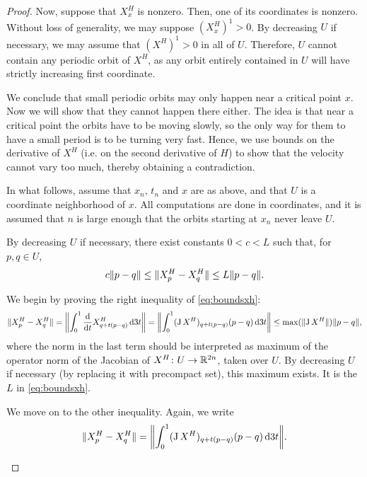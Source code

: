 \begin{proof}
Now, suppose that $X^H_x$ is nonzero. Then, one of its coordinates is nonzero. Without loss of generality, we may suppose $(X^H_x)^1 > 0$. By decreasing $U$ if necessary, we may assume that $(X^H)^1 > 0$ in all of $U$. Therefore, $U$ cannot contain any periodic orbit of $X^H$, as any orbit entirely contained in $U$ will have strictly increasing first coordinate.

We conclude that small periodic orbits may only happen near a critical point $x$. Now we will show that they cannot happen there either. The idea is that near a critical point the orbits have to be moving slowly, so the only way for them to have a small period is to be turning very fast. Hence, we use bounds on the derivative of $X^H$ (i.e. on the second derivative of $H$) to show that the velocity cannot vary too much, thereby obtaining a contradiction.

In what follows, assume that $x_n$, $t_n$ and $x$ are as above, and that $U$ is a coordinate neighborhood of $x$. All computations are done in coordinates, and it is assumed that $n$ is large enough that the orbits starting at $x_n$ never leave $U$.

\begin{lemma}\label{lemma:boundsxh}
By decreasing $U$ if necessary, there exist constants $0 < c < L$ such that, for $p, q \in U$,
\begin{equation}\label{eq:boundsxh}
c \lVert p-q\rVert \leq \lVert X^H_p - X^H_q\rVert \leq L \lVert p-q\rVert.
\end{equation}
\end{lemma}

\begin{lemmaproof}
We begin by proving the right inequality of \eqref{eq:boundsxh}:
\begin{equation}
\Norm{X^H_p - X^H_q} = \Norm*{\int_0^1 \diff*{X^H_{q + t(p-q)}}t \dl3 t} = \Norm*{\int_0^1 (\jacobian X^H)_{q+t(p-q)} (p-q) \dl3 t} \leq \max(\Norm{\jacobian X^H}) \Norm{p-q},
\end{equation}
where the norm in the last term should be interpreted as maximum of the operator norm of the Jacobian of $X^H \colon U \to \mathbb{R}^{2n}$, taken over $U$. By decreasing $U$ if necessary (by replacing it with precompact set), this maximum exists. It is the $L$ in \eqref{eq:boundsxh}.

We move on to the other inequality. Again, we write
\begin{equation}
\Norm{X^H_p - X^H_q} = \Norm*{\int_0^1 (\jacobian X^H)_{q+t(p-q)} (p-q) \dl3 t}.
\end{equation}


\end{lemmaproof}
\end{proof}
